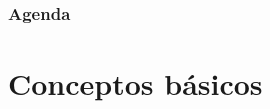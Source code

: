 
\begin{frame}[t,plain]
\titlepage
\end{frame}

\watermarkon

\begin{frame}
	\frametitle{Agenda}
	
	\tableofcontents[]
\end{frame}
\watermarkoff



\section{Conceptos básicos}






